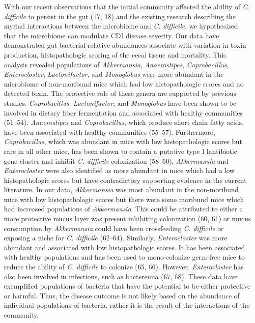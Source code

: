 \documentclass[
  12pt,
]{article}
\begin{document}
With our recent observations that the initial community affected the
ability of \emph{C. difficile} to persist in the gut (17, 18) and the
existing research describing the myriad interactions between the
microbiome and \emph{C. difficile}, we hypothesized that the microbiome
can modulate CDI disease severity. Our data have demonstrated gut
bacterial relative abundances associate with variation in toxin
production, histopathologic scoring of the cecal tissue and mortality.
This analysis revealed populations of \emph{Akkermansia},
\emph{Anaerostipes}, \emph{Coprobacillus}, \emph{Enterocloster},
\emph{Lactonifactor}, and \emph{Monoglobus} were more abundant in the
microbiome of non-moribund mice which had low histopathologic scores and
no detected toxin. The protective role of these genera are supported by
previous studies. \emph{Coprobacillus}, \emph{Lactonifactor}, and
\emph{Monoglobus} have been shown to be involved in dietary fiber
fermentation and associated with healthy communities (51--54).
\emph{Anaerostipes} and \emph{Coprobacillus}, which produce short chain
fatty acids, have been associated with healthy communities (55--57).
Furthermore, \emph{Coprobacillus}, which was abundant in mice with low
histopathologic scores but rare in all other mice, has been shown to
contain a putative type I lantibiotic gene cluster and inhibit \emph{C.
difficile} colonization (58--60). \emph{Akkermansia} and
\emph{Enterocloster} were also identified as more abundant in mice which
had a low histopathologic scores but have contradictory supporting
evidence in the current literature. In our data, \emph{Akkermansia} was
most abundant in the non-moribund mice with low histopathologic scores
but there were some moribund mice which had increased populations of
\emph{Akkermansia}. This could be attributed to either a more protective
mucus layer was present inhibiting colonization (60, 61) or mucus
consumption by \emph{Akkermansia} could have been crossfeeding \emph{C.
difficile} or exposing a niche for \emph{C. difficile} (62--64).
Similarly, \emph{Enterocloster} was more abundant and associated with
low histopathologic scores. It has been associated with healthy
populations and has been used to mono-colonize germ-free mice to reduce
the ability of \emph{C. difficile} to colonize (65, 66). However,
\emph{Enterocloster} has also been involved in infections, such as
bacteremia (67, 68). These data have exemplified populations of bacteria
that have the potential to be either protective or harmful. Thus, the
disease outcome is not likely based on the abundance of individual
populations of bacteria, rather it is the result of the interactions of
the community.
\end{document}
